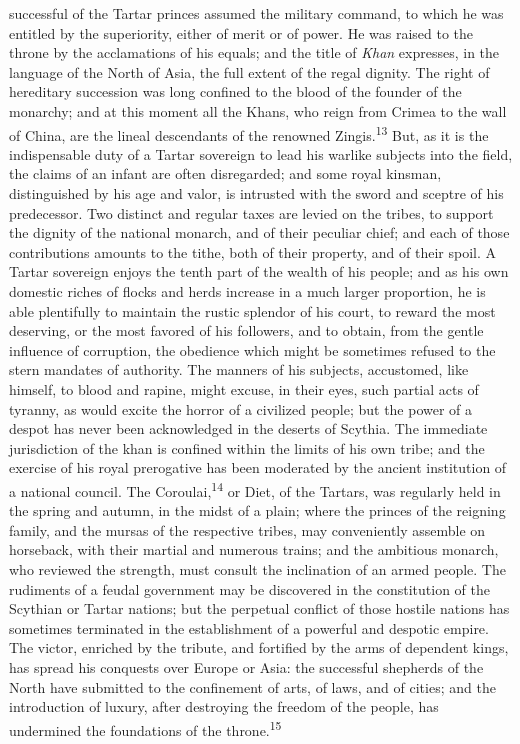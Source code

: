 successful of the Tartar princes assumed the military command, to
which he was entitled by the superiority, either of merit or of
power. He was raised to the throne by the acclamations of his
equals; and the title of \textit{Khan} expresses, in the language of the
North of Asia, the full extent of the regal dignity. The right of
hereditary succession was long confined to the blood of the
founder of the monarchy; and at this moment all the Khans, who
reign from Crimea to the wall of China, are the lineal
descendants of the renowned Zingis.\textsuperscript{13} But, as it is the
indispensable duty of a Tartar sovereign to lead his warlike
subjects into the field, the claims of an infant are often
disregarded; and some royal kinsman, distinguished by his age and
valor, is intrusted with the sword and sceptre of his
predecessor. Two distinct and regular taxes are levied on the
tribes, to support the dignity of the national monarch, and of
their peculiar chief; and each of those contributions amounts to
the tithe, both of their property, and of their spoil. A Tartar
sovereign enjoys the tenth part of the wealth of his people; and
as his own domestic riches of flocks and herds increase in a much
larger proportion, he is able plentifully to maintain the rustic
splendor of his court, to reward the most deserving, or the most
favored of his followers, and to obtain, from the gentle
influence of corruption, the obedience which might be sometimes
refused to the stern mandates of authority. The manners of his
subjects, accustomed, like himself, to blood and rapine, might
excuse, in their eyes, such partial acts of tyranny, as would
excite the horror of a civilized people; but the power of a
despot has never been acknowledged in the deserts of Scythia. The
immediate jurisdiction of the khan is confined within the limits
of his own tribe; and the exercise of his royal prerogative has
been moderated by the ancient institution of a national council.
The Coroulai,\textsuperscript{14} or Diet, of the Tartars, was regularly held in
the spring and autumn, in the midst of a plain; where the princes
of the reigning family, and the mursas of the respective tribes,
may conveniently assemble on horseback, with their martial and
numerous trains; and the ambitious monarch, who reviewed the
strength, must consult the inclination of an armed people. The
rudiments of a feudal government may be discovered in the
constitution of the Scythian or Tartar nations; but the perpetual
conflict of those hostile nations has sometimes terminated in the
establishment of a powerful and despotic empire. The victor,
enriched by the tribute, and fortified by the arms of dependent
kings, has spread his conquests over Europe or Asia: the
successful shepherds of the North have submitted to the
confinement of arts, of laws, and of cities; and the introduction
of luxury, after destroying the freedom of the people, has
undermined the foundations of the throne.\textsuperscript{15}


